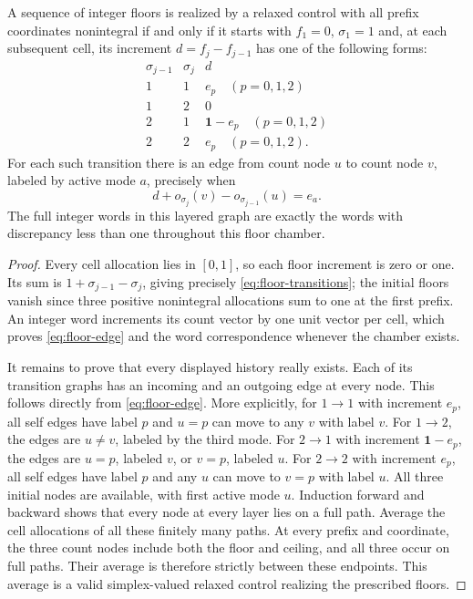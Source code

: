 \begin{proposition}\label{prop:floor-automaton}
A sequence of integer floors is realized by a relaxed control with all
prefix coordinates nonintegral if and only if it starts with
$f_1=0$, $\sigma_1=1$ and, at each subsequent cell, its increment
$d=f_j-f_{j-1}$ has one of the following forms:
\begin{equation}\label{eq:floor-transitions}
\begin{array}{c|c|c}
\sigma_{j-1}&\sigma_j&d\\\hline
1&1&e_p\quad(p=0,1,2)\\
1&2&0\\
2&1&\mathbf1-e_p\quad(p=0,1,2)\\
2&2&e_p\quad(p=0,1,2).
\end{array}
\end{equation}
For each such transition there is an edge from count node $u$ to count
node $v$, labeled by active mode $a$, precisely when
\begin{equation}\label{eq:floor-edge}
 d+o_{\sigma_j}(v)-o_{\sigma_{j-1}}(u)=e_a.
\end{equation}
The full integer words in this layered graph are exactly the words with
discrepancy less than one throughout this floor chamber.
\end{proposition}
\begin{proof}
Every cell allocation lies in $[0,1]$, so each floor increment is zero or
one. Its sum is $1+\sigma_{j-1}-\sigma_j$, giving precisely
\eqref{eq:floor-transitions}; the initial floors vanish since three
positive nonintegral allocations sum to one at the first prefix.
An integer word increments its count vector by one unit vector per cell,
which proves \eqref{eq:floor-edge} and the word correspondence whenever
the chamber exists.

It remains to prove that every displayed history really exists. Each of
its transition graphs has an incoming and an outgoing edge at every node.
This follows directly from \eqref{eq:floor-edge}. More explicitly,
for $1\to1$ with increment $e_p$, all self edges have label $p$ and
$u=p$ can move to any $v$ with label $v$.
For $1\to2$, the edges are $u\ne v$, labeled by the third mode.
For $2\to1$ with increment $\mathbf1-e_p$, the edges are $u=p$,
labeled $v$, or $v=p$, labeled $u$.
For $2\to2$ with increment $e_p$, all self edges have label $p$ and
any $u$ can move to $v=p$ with label $u$.
All three initial nodes are available, with first active mode $u$.
Induction forward and backward shows that every node at every layer lies
on a full path. Average the cell allocations of all these finitely many
paths. At every prefix and coordinate, the three count nodes include both
the floor and ceiling, and all three occur on full paths. Their average
is therefore strictly between these endpoints. This average is a valid
simplex-valued relaxed control realizing the prescribed floors.
\end{proof}
